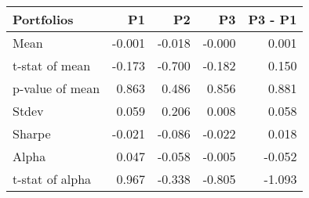 \begin{tabular}{lrrrr}
\toprule
Portfolios & P1 & P2 & P3 & P3 - P1 \\
\midrule
Mean & -0.001 & -0.018 & -0.000 & 0.001 \\
t-stat of mean & -0.173 & -0.700 & -0.182 & 0.150 \\
p-value of mean & 0.863 & 0.486 & 0.856 & 0.881 \\
Stdev & 0.059 & 0.206 & 0.008 & 0.058 \\
Sharpe & -0.021 & -0.086 & -0.022 & 0.018 \\
Alpha & 0.047 & -0.058 & -0.005 & -0.052 \\
t-stat of alpha & 0.967 & -0.338 & -0.805 & -1.093 \\
\bottomrule
\end{tabular}
